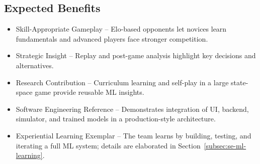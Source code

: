 \documentclass{article}
\begin{document}
\subsection{Expected Benefits}\label{subsec:expected-benefits}
\begin{itemize}
    \item {Skill-Appropriate Gameplay} – Elo-based opponents let novices learn fundamentals and advanced players face stronger competition.
    \item {Strategic Insight} – Replay and post-game analysis highlight key decisions and alternatives.
    \item {\AI{} Research Contribution} – Curriculum learning and self-play in a large state-space game provide reusable ML insights.
    \item {Software Engineering Reference} – Demonstrates integration of UI, backend, simulator, and trained models in a production-style architecture.
    \item {Experiential Learning Exemplar} – The team learns by building, testing, and iterating a full ML system; details are elaborated in Section~\ref{subsec:se-ml-learning}.
\end{itemize}
\end{document}
